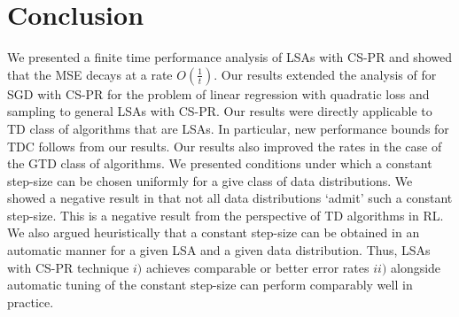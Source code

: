 \section{Conclusion}
We presented a finite time performance analysis of LSAs with CS-PR and showed that the MSE decays at a rate $O(\frac{1}{t})$. Our results extended the analysis of \citet{bach} for SGD with CS-PR for the problem of linear regression with quadratic loss and \iid sampling to general LSAs with CS-PR. Our results were directly applicable to TD class of algorithms that are LSAs. In particular, new performance bounds for TDC follows from our results. Our results also improved the rates in the case of the GTD class of algorithms. We presented conditions under which a constant step-size can be chosen uniformly for a give class of data distributions. We showed a negative result in that not all data distributions `admit' such a constant step-size. This is a negative result from the perspective of TD algorithms in RL. We also argued heuristically that a constant step-size can be obtained in an automatic manner for a given LSA and a given data distribution. Thus, LSAs with CS-PR technique $i)$ achieves comparable or better error rates $ii)$ alongside automatic tuning of the constant step-size can perform comparably well in practice.
